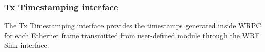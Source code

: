 \subsubsection{Tx Timestamping interface}
\label{sec:txts}


The Tx Timestamping interface provides the timestamps generated inside WRPC for each
Ethernet frame transmitted from user-defined module through the WRF Sink interface.\\

